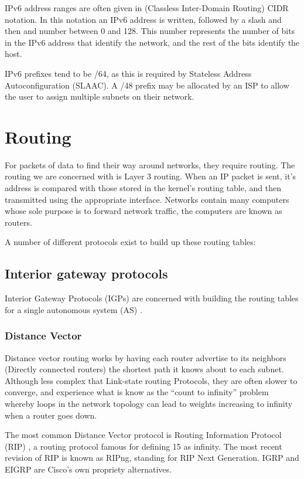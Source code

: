 \documentclass[12pt]{report}
\begin{document}
IPv6 address ranges are often given in (Classless Inter-Domain Routing) CIDR
 notation. In this notation
an IPv6 address is written, followed by a slash and then and number between 0
and 128. This number represents the number of bits in the IPv6 address that
identify the network, and the rest of the bits identify the host.

IPv6 prefixes tend to be /64, as this is required by Stateless Address
Autoconfiguration (SLAAC). A /48 prefix may be allocated by an ISP to allow the user
to assign multiple subnets on their network.

\section{Routing}
For packets of data to find their way around networks, they require
routing. The routing we are concerned with is Layer 3 routing. When an IP
packet is sent, it's address is compared with those stored in the kernel's
routing table, and then transmitted using the appropriate interface. Networks
contain many computers whose sole purpose is to forward network traffic, the
computers are known as routers. 

A number of different protocols exist to build up these routing tables:

\subsection{Interior gateway protocols}
Interior Gateway Protocols (IGPs)  are concerned with building the routing tables for a single
autonomous system (AS) . 

\subsubsection{Distance Vector}
Distance vector routing works by having each router advertise to its neighbors
(Directly connected routers) the shortest path it knows about to each subnet.
Although less complex that Link-state routing Protocols, they are often slower
to converge, and experience what is know as the ``count to infinity'' problem
whereby loops in the network topology can lead to weights increasing to
infinity when a router goes down. 

The most common Distance Vector protocol is Routing Information Protocol (RIP)
, a routing protocol famous for
defining 15 as infinity. The most recent revision of RIP is known as RIPng,
standing for RIP Next Generation. IGRP and EIGRP are Cisco's own propriety
alternatives.
\end{document}
